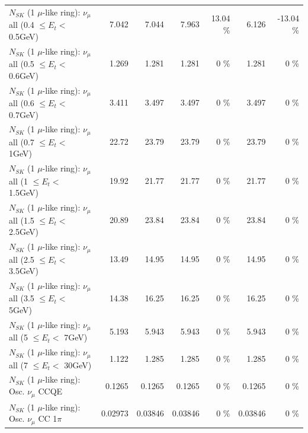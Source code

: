 \begin{table}
\begin{tabular}{| l | r | r | r  r | r  r |}
       $N_{SK}$ (1 $\mu$-like ring): $\nu_{\mu}$ all (0.4 $\leq E_{t} <$ 0.5GeV) &           7.042 &           7.044 &           7.963 &    13.04 \%  &           6.126 &   -13.04 \%  \\ 
       $N_{SK}$ (1 $\mu$-like ring): $\nu_{\mu}$ all (0.5 $\leq E_{t} <$ 0.6GeV) &           1.269 &           1.281 &           1.281 &        0 \%  &           1.281 &        0 \%  \\ 
       $N_{SK}$ (1 $\mu$-like ring): $\nu_{\mu}$ all (0.6 $\leq E_{t} <$ 0.7GeV) &           3.411 &           3.497 &           3.497 &        0 \%  &           3.497 &        0 \%  \\ 
         $N_{SK}$ (1 $\mu$-like ring): $\nu_{\mu}$ all (0.7 $\leq E_{t} <$ 1GeV) &           22.72 &           23.79 &           23.79 &        0 \%  &           23.79 &        0 \%  \\ 
         $N_{SK}$ (1 $\mu$-like ring): $\nu_{\mu}$ all (1 $\leq E_{t} <$ 1.5GeV) &           19.92 &           21.77 &           21.77 &        0 \%  &           21.77 &        0 \%  \\ 
       $N_{SK}$ (1 $\mu$-like ring): $\nu_{\mu}$ all (1.5 $\leq E_{t} <$ 2.5GeV) &           20.89 &           23.84 &           23.84 &        0 \%  &           23.84 &        0 \%  \\ 
       $N_{SK}$ (1 $\mu$-like ring): $\nu_{\mu}$ all (2.5 $\leq E_{t} <$ 3.5GeV) &           13.49 &           14.95 &           14.95 &        0 \%  &           14.95 &        0 \%  \\ 
         $N_{SK}$ (1 $\mu$-like ring): $\nu_{\mu}$ all (3.5 $\leq E_{t} <$ 5GeV) &           14.38 &           16.25 &           16.25 &        0 \%  &           16.25 &        0 \%  \\ 
           $N_{SK}$ (1 $\mu$-like ring): $\nu_{\mu}$ all (5 $\leq E_{t} <$ 7GeV) &           5.193 &           5.943 &           5.943 &        0 \%  &           5.943 &        0 \%  \\ 
          $N_{SK}$ (1 $\mu$-like ring): $\nu_{\mu}$ all (7 $\leq E_{t} <$ 30GeV) &           1.122 &           1.285 &           1.285 &        0 \%  &           1.285 &        0 \%  \\ 
\hline
\hline
                               $N_{SK}$ (1 $\mu$-like ring): Osc. $\nu_\mu$ CCQE &          0.1265 &          0.1265 &          0.1265 &        0 \%  &          0.1265 &        0 \%  \\ 
                          $N_{SK}$ (1 $\mu$-like ring): Osc. $\nu_\mu$ CC 1$\pi$ &         0.02973 &         0.03846 &         0.03846 &        0 \%  &         0.03846 &        0 \%  \\ 

\end{tabular}
\end{table}
